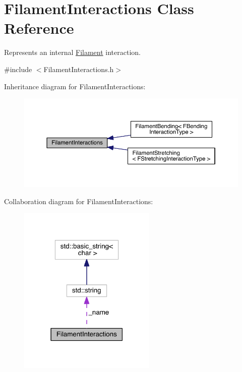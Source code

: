\hypertarget{classFilamentInteractions}{\section{Filament\+Interactions Class Reference}
\label{classFilamentInteractions}
}


Represents an internal \hyperlink{classFilament}{Filament} interaction.  




{\ttfamily \#include $<$Filament\+Interactions.\+h$>$}



Inheritance diagram for Filament\+Interactions\+:
\nopagebreak
\begin{figure}[H]
\begin{center}
\leavevmode
\includegraphics[width=350pt]{classFilamentInteractions__inherit__graph}
\end{center}
\end{figure}


Collaboration diagram for Filament\+Interactions\+:\nopagebreak
\begin{figure}[H]
\begin{center}
\leavevmode
\includegraphics[width=186pt]{classFilamentInteractions__coll__graph}
\end{center}
\end{figure}
